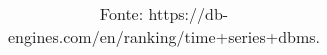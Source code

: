 \begin{table}[htbp]
\begin{tabular}{@{}llllllll@{}}
\end{tabular}
\caption{Fonte: https://db-engines.com/en/ranking/time+series+dbms.}
\label{tab:rankdbengines}
\end{table} 
\pagestyle{plain}